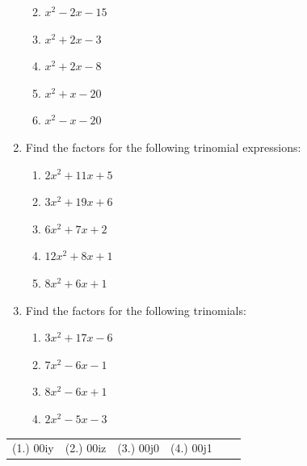 \begin{enumerate}[noitemsep, label=\textbf{\arabic*}. ]
\begin{enumerate}[noitemsep, label=\textbf{\alph*}. ]
            \label{m39394*uid32}\item ${x}^{2}-2x-15$\label{m39394*uid33}\item ${x}^{2}+2x-3$\label{m39394*uid34}\item ${x}^{2}+2x-8$\label{m39394*uid35}\item ${x}^{2}+x-20$\label{m39394*uid36}\item ${x}^{2}-x-20$
\newline
\newline
\end{enumerate}
        \label{m39394*uid37}\item Find the factors for the following trinomial expressions:
\label{m39394*id277980}\begin{enumerate}[noitemsep, label=\textbf{\alph*}. ] 
            \label{m39394*uid38}\item $2{x}^{2}+11x+5$\label{m39394*uid39}\item $3{x}^{2}+19x+6$\label{m39394*uid40}\item $6{x}^{2}+7x+2$\label{m39394*uid41}\item $12{x}^{2}+8x+1$\label{m39394*uid42}\item $8{x}^{2}+6x+1$
\newline
\newline
\end{enumerate}
        \label{m39394*uid43}\item Find the factors for the following trinomials:
\label{m39394*id278184}\begin{enumerate}[noitemsep, label=\textbf{\alph*}. ] 
            \label{m39394*uid44}\item $3{x}^{2}+17x-6$\label{m39394*uid45}\item $7{x}^{2}-6x-1$\label{m39394*uid46}\item $8{x}^{2}-6x+1$\label{m39394*uid47}\item $2{x}^{2}-5x-3$
\newline
\newline
\end{enumerate}
        \end{enumerate}
    \label{m39394*cid6}
\practiceinfo
\par 
 \par \begin{tabular}[h]{cccccc}
 (1.) 00iy&  (2.) 00iz&  (3.) 00j0&  (4.) 00j1& \end{tabular}

